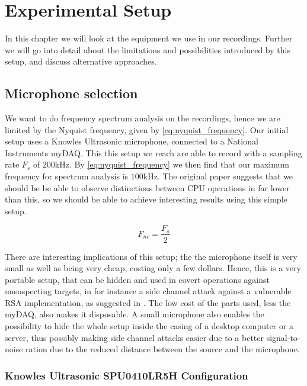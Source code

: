 \chapter{Experimental Setup}
In this chapter we will look at the equipment we use in our recordings.
Further we will go into detail about the limitations and possibilities introduced by this setup, and discuss alternative approaches.

\label{chp:experimental_setup} 

\section{Microphone selection}\label{sec:ch3_microphone_selection}

We want to do frequency spectrum analysis on the recordings, hence we are limited by the Nyquist frequency, given by \autoref{eq:nyquist_frequency}.
Our initial setup uses a Knowles Ultrasonic microphone, connected to a National Instruments myDAQ. 
This this setup we reach are able to record with a sampling rate \({F_{s}}\) of \(200\)kHz. 
By \autoref{eq:nyquist_frequency} we then find that our maximum frequency for spectrum analysis is \(100\)kHz.
The original paper  suggests that we should be be able to observe distinctions between CPU operations in far lower than this, so we should be able to achieve interesting results using this simple setup.

\begin{equation}\label{eq:nyquist_frequency}
F_{nc} = \frac{F_{s}}{2}
\end{equation}

There are interesting implications of this setup; the the microphone itself is very small as well as being very cheap, costing only a few dollars\cite{butikken}. 
Hence, this is a very portable setup, that can be hidden and used in covert operations against unsuspecting targets, in for instance a side channel attack against a vulnerable RSA implementation, as suggested in \cite{paper}.
The low cost of the parts used, less the myDAQ, also makes it disposable.
A small microphone also enables the possibility to hide the whole setup inside the casing of a desktop computer or a server, thus possibly making side channel attacks easier due to a better signal-to-noise ration due to the reduced distance between the source and the microphone.

\subsection{Knowles Ultrasonic SPU0410LR5H Configuration}\label{sec:ch3_knowles_configuration}

